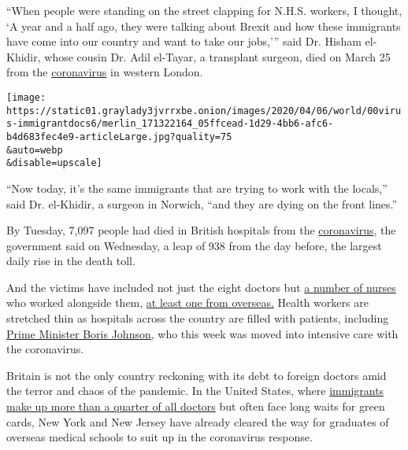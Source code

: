 ``When people were standing on the street clapping for N.H.S. workers, I
thought, `A year and a half ago, they were talking about Brexit and how
these immigrants have come into our country and want to take our
jobs,''' said Dr. Hisham el-Khidir, whose cousin Dr. Adil el-Tayar, a
transplant surgeon, died on March 25 from the
\href{https://www.nytimes3xbfgragh.onion/2020/04/10/technology/coronavirus-5g-uk.html}{coronavirus}
in western London.

\texttt{[image: https://static01.graylady3jvrrxbe.onion/images/2020/04/06/world/00virus-immigrantdocs6/merlin\_171322164\_05ffcead-1d29-4bb6-afc6-b4d683fec4e9-articleLarge.jpg?quality=75\\\&auto=webp\\\&disable=upscale]}

``Now today, it's the same immigrants that are trying to work with the
locals,'' said Dr. el-Khidir, a surgeon in Norwich, ``and they are dying
on the front lines.''

By Tuesday, 7,097 people had died in British hospitals from the
\href{https://www.nytimes3xbfgragh.onion/2020/04/10/world/asia/coronavirus-migrants.html}{coronavirus},
the government said on Wednesday, a leap of 938 from the day before, the
largest daily rise in the death toll.

And the victims have included not just the eight doctors but
\href{https://www.bbc.co.uk/news/uk-england-52165167}{a number of
nurses} who worked alongside them,
\href{https://www.theguardian.com/society/2020/apr/07/hong-kong-born-nurse-dies-of-coronavirus-after-44-years-with-nhs?utm_term=Autofeed\&CMP=twt_b-gdnnews\&utm_medium=Social\&utm_source=Twitter\#Echobox=1586279774}{at
least one from overseas.} Health workers are stretched thin as hospitals
across the country are filled with patients, including
\href{https://www.nytimes3xbfgragh.onion/2020/04/06/world/europe/boris-johnson-coronavirus-hospital-intensive-care.html}{Prime
Minister Boris Johnson}, who this week was moved into intensive care
with the coronavirus.

Britain is not the only country reckoning with its debt to foreign
doctors amid the terror and chaos of the pandemic. In the United States,
where
\href{https://www.reuters.com/article/us-health-professions-us-noncitizens/u-s-relies-heavily-on-foreign-born-healthcare-workers-idUSKBN1O32FR}{immigrants
make up more than a quarter of all doctors} but often face long waits
for green cards, New York and New Jersey have already cleared the way
for graduates of overseas medical schools to suit up in the coronavirus
response.

